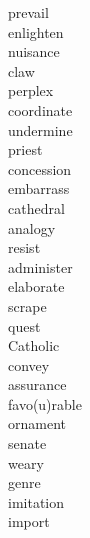 \documentclass[a4paper, 11pt]{ctexart}
\begin{document}
\begin{multicols*}{3}
\begin{description}
\item[prevail]

\item[enlighten]

\item[nuisance]

\item[claw]

\item[perplex]

\item[coordinate]

\item[undermine]

\item[priest]

\item[concession]

\item[embarrass]

\item[cathedral]

\item[analogy]

\item[resist]

\item[administer]

\item[elaborate]

\item[scrape]

\item[quest]

\item[Catholic]

\item[convey]

\item[assurance]

\item[favo(u)rable]

\item[ornament]

\item[senate]

\item[weary]

\item[genre]

\item[imitation]

\item[import]


\end{description}
\end{multicols*}
\end{document}
